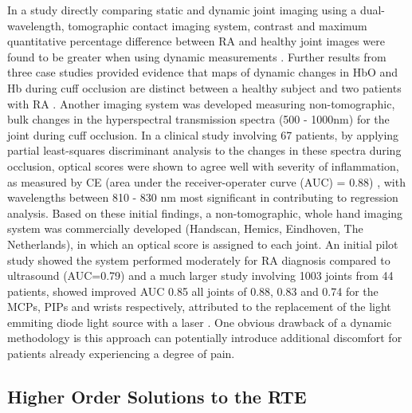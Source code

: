 \documentclass[twoside]{bhamthesis}
\theoremstyle{definition}
\begin{document}
In a study directly comparing static and dynamic joint imaging using a dual-wavelength, tomographic contact imaging system, contrast and maximum quantitative percentage difference between RA and healthy joint images were found to be greater when using dynamic measurements \cite{lasker2006comparison}. Further results from three case studies provided evidence that maps of dynamic changes in HbO and Hb during cuff occlusion are distinct between a healthy subject and two patients with RA \cite{lasker2007dynamic}. Another imaging system was developed measuring non-tomographic, bulk changes in the hyperspectral transmission spectra (500 - 1000nm) for the joint during cuff occlusion. In a clinical study involving 67 patients, by applying partial least-squares discriminant analysis to the changes in these spectra during occlusion, optical scores were shown to agree well with severity of inflammation, as measured by CE (area under the receiver-operater curve (AUC) = 0.88) \cite{meier2012potential}, with wavelengths between 810 - 830 nm most significant in contributing to regression analysis. Based on these initial findings, a non-tomographic, whole hand imaging system was commercially developed (Handscan, Hemics, Eindhoven, The Netherlands), in which an optical score is assigned to each joint. An initial pilot study showed the system performed moderately for RA diagnosis compared to ultrasound (AUC=0.79) \cite{van2016assessment} and a much larger study involving 1003 joints from 44 patients, showed improved AUC 0.85 all joints of 0.88, 0.83 and 0.74 for the MCPs, PIPs and wrists respectively, attributed to the replacement of the light emmiting diode light source with a laser \cite{besselink2018optical}. One obvious drawback of a dynamic methodology is  this approach can potentially introduce additional discomfort for patients already experiencing a degree of pain.

\subsection{Higher Order Solutions to the RTE}
\label{Higher Order Solutions to the RTE}
\end{document}
